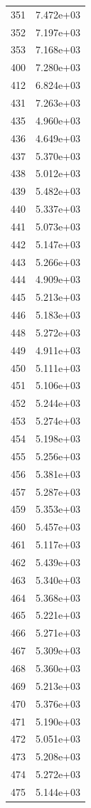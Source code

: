 \documentclass[12pt]{article}
\begin{document}
\begin{longtable}{@{}cc@{}}
351 & 7.472e+03 \\
352 & 7.197e+03 \\
353 & 7.168e+03 \\
400 & 7.280e+03 \\
412 & 6.824e+03 \\
431 & 7.263e+03 \\
435 & 4.960e+03 \\
436 & 4.649e+03 \\
437 & 5.370e+03 \\
438 & 5.012e+03 \\
439 & 5.482e+03 \\
440 & 5.337e+03 \\
441 & 5.073e+03 \\
442 & 5.147e+03 \\
443 & 5.266e+03 \\
444 & 4.909e+03 \\
445 & 5.213e+03 \\
446 & 5.183e+03 \\
448 & 5.272e+03 \\
449 & 4.911e+03 \\
450 & 5.111e+03 \\
451 & 5.106e+03 \\
452 & 5.244e+03 \\
453 & 5.274e+03 \\
454 & 5.198e+03 \\
455 & 5.256e+03 \\
456 & 5.381e+03 \\
457 & 5.287e+03 \\
459 & 5.353e+03 \\
460 & 5.457e+03 \\
461 & 5.117e+03 \\
462 & 5.439e+03 \\
463 & 5.340e+03 \\
464 & 5.368e+03 \\
465 & 5.221e+03 \\
466 & 5.271e+03 \\
467 & 5.309e+03 \\
468 & 5.360e+03 \\
469 & 5.213e+03 \\
470 & 5.376e+03 \\
471 & 5.190e+03 \\
472 & 5.051e+03 \\
473 & 5.208e+03 \\
474 & 5.272e+03 \\
475 & 5.144e+03 \\

\end{longtable}
\end{document}
